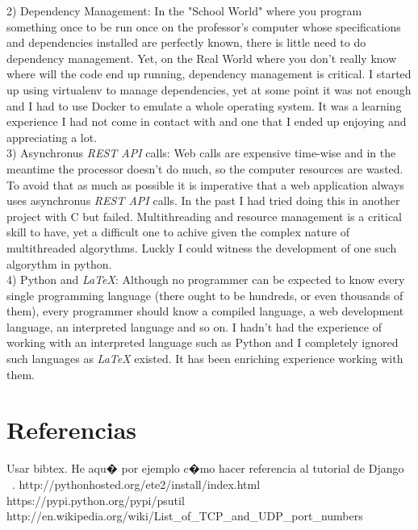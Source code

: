 \documentclass[10pt]{article}
\begin{document}
2) Dependency Management: In the "School World" where you program something once to be run once on the professor's computer whose specifications and dependencies installed are perfectly known, there is little need to do dependency management. Yet, on the Real World where you don't really know where will the code end up running, dependency management is critical. I started up using virtualenv to manage dependencies, yet at some point it was not enough and I had to use Docker to emulate a whole operating system. It was a learning experience I had not come in contact with and one that I ended up enjoying and appreciating a lot.\\

3) Asynchronus \textit{REST API} calls: Web calls are expensive time-wise and in the meantime the processor doesn't do much, so the computer resources are wasted. To avoid that as much as possible it is imperative that a web application always uses asynchronus \textit{REST API} calls. In the past I had tried doing this in another project with C but failed. Multithreading and resource management is a critical skill to have, yet a difficult one to achive given the complex nature of multithreaded algorythms. Luckly I could witness the development of one such algorythm in python.\\

4) Python and \textit{LaTeX}: Although no programmer can be expected to know every single programming language (there ought to be hundreds, or even thousands of them), every programmer should know a compiled language, a web development language, an interpreted language and so on. I hadn't had the experience of working with an interpreted language such as Python and I completely ignored such languages as \textit{LaTeX} existed. It has been enriching experience working with them.\\

\section{Referencias}
 Usar bibtex. He aqu� por ejemplo c�mo hacer referencia al tutorial de Django ~\cite{DjangoTut}.
http://pythonhosted.org/ete2/install/index.html
https://pypi.python.org/pypi/psutil
http://en.wikipedia.org/wiki/List\_of\_TCP\_and\_UDP\_port\_numbers
{}

\end{document}
